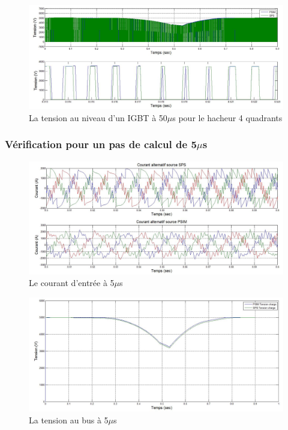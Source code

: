 \documentclass[11pt,letterpaper,final]{report}
\begin{document}
\begin{figure}[htb]
\centering
\includegraphics[scale=0.5]{Fig/Hach_AFE/50u/IGBT_ten_hach.jpg}
\caption{La tension au niveau d'un IGBT à 50$\mu$s pour le hacheur 4 quadrants}
\label{AF_HA_HAV50}
\end{figure}

\clearpage
\subsubsection{Vérification pour un pas de calcul de 5$\mu$s}

\begin{figure}[htb]
\centering
\includegraphics[scale=0.5]{Fig/Hach_AFE/5u/cour_al.jpg}
\caption{Le courant d'entrée à 5$\mu$s}
\label{AF_HA_cou5}
\end{figure}

\begin{figure}[htb]
\centering
\includegraphics[scale=0.5]{Fig/Hach_AFE/5u/ten_bus.jpg}
\caption{La tension au bus à 5$\mu$s}
\label{AF_HA_vc5h}
\end{figure}
\end{document}
